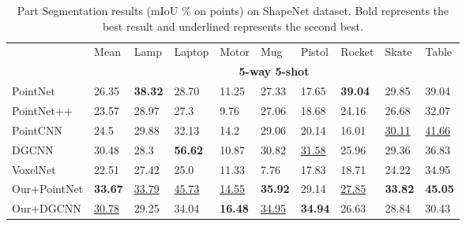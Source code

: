 \documentclass{article}
\begin{document}
\begin{table}[h]
  \caption{Part Segmentation results (mIoU \% on points) on ShapeNet dataset. Bold represents the best result and underlined represents the second best.}
  \label{part2}
  \centering
  \normalsize
  \setlength{\tabcolsep}{4.5pt}
  \begin{tabular}{llllllllll}
    \toprule
    
    &Mean &Lamp&Laptop&Motor&Mug&Pistol&Rocket&Skate&Table\\

    \cmidrule(r){2-10}
    & \multicolumn{9}{c}{\textbf{5-way 5-shot}}\\
    \cmidrule(r){2-10}
    PointNet & 26.35 & \textbf{38.32} &28.70 &11.25 &27.33 &17.65 &\textbf{39.04} &29.85 &39.04\\ 
    PointNet++ &23.57 &28.97 &27.3 &9.76 &27.06 &18.68 &24.16 &26.68 &32.07\\
    PointCNN &24.5 &29.88 &32.13 &14.2 &29.06 &20.14 &16.01 &\underline{30.11} &\underline{41.66}\\
    DGCNN & 30.48 & 28.3&\textbf{56.62}&10.87&30.82&\underline{31.58}&25.96&29.36&36.83\\
    VoxelNet & 22.51 &27.42 &25.0 &11.33 &7.76 &17.83 &18.71 &24.22 &34.95\\
    \midrule
    Our+PointNet &\textbf{33.67} &\underline{33.79} &\underline{45.73} &\underline{14.55} &\textbf{35.92} &29.14 &\underline{27.85} &\textbf{33.82} &\textbf{45.05} \\
    Our+DGCNN & \underline{30.78} & 29.25&34.04&\textbf{16.48}&\underline{34.95}&\textbf{34.94}&26.63&28.84&30.43\\
    \bottomrule
  \end{tabular}
\end{table}
\end{document}
